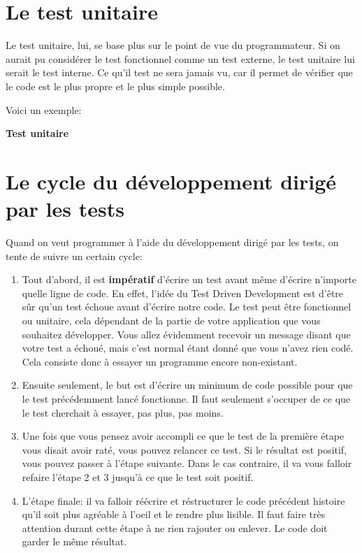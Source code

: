 \documentclass[letterpaper,10pt,french]{sphinxmanual}
\begin{document}
\section{Le test unitaire}
\label{tdd:le-test-unitaire}
Le test unitaire, lui, se base plus sur le point de vue du programmateur. Si on
aurait pu considérer le test fonctionnel comme un test externe, le test unitaire
lui serait le test interne. Ce qu'il test ne sera jamais vu, car il permet de
vérifier que le code est le plus propre et le plus simple possible.

Voici un exemple:

\textbf{Test unitaire}


\section{Le cycle du développement dirigé par les tests}
\label{tdd:le-cycle-du-developpement-dirige-par-les-tests}
Quand on veut programmer à l'aide du développement dirigé par les tests, on
tente de suivre un certain cycle:
\begin{enumerate}
\item {} 
Tout d'abord, il est \textbf{impératif} d'écrire un test avant même d'écrire
n'importe quelle ligne de code. En effet, l'idée du Test Driven Development
est d'être sûr qu'un test échoue avant d'écrire notre code. Le test peut
être fonctionnel ou unitaire, cela dépendant de la partie de votre
application que vous souhaitez développer. Vous allez évidemment recevoir
un message disant que votre test a échoué, mais c'est normal étant
donné que vous n'avez rien codé. Cela consiste donc à essayer un
programme encore non-existant.

\item {} 
Ensuite seulement, le but est d'écrire un minimum de code possible
pour que le test précédemment lancé fonctionne. Il faut seulement s'occuper
de ce que le test cherchait à essayer, pas plus, pas moins.

\item {} 
Une fois que vous pensez avoir accompli ce que le test de la première étape
vous disait avoir raté, vous pouvez relancer ce test. Si le résultat
est positif, vous pouvez passer à l'étape suivante. Dans le cas contraire,
il va vous falloir refaire l'étape 2 et 3 jusqu'à ce que le test soit
positif.

\item {} 
L'étape finale: il va falloir réécrire et réstructurer le code précédent
histoire qu'il soit plus agréable à l'oeil et le rendre plus lisible.
Il faut faire très attention durant cette étape à ne rien rajouter ou
enlever. Le code doit garder le même résultat.

\end{enumerate}
\end{document}
